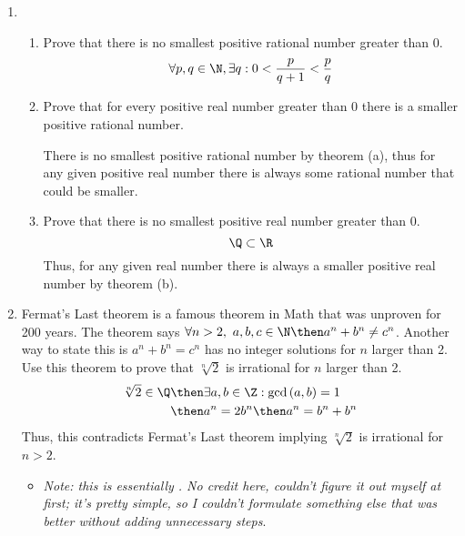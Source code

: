 \documentclass[basic, header]{nosvagor-notes}
\begin{document}
\begin{enumerate}[itemsep=5em]
    \item
    \begin{enumerate}[itemsep=3em]

      \item Prove that there is no smallest positive rational number greater
        than 0.
        \begin{align*}
          \forall p,q \in \N, \exists q : 0 < \frac{p}{q+1} < \frac{p}{q}
        \end{align*}

      \item Prove that for every positive real number greater than 0 there is a
        smaller positive rational number.

        There is no smallest positive rational number by theorem (a), thus
        for any given positive real number there is always some rational number
        that could be smaller.


      \item Prove that there is no smallest positive real number greater than 0.
        \[\Q \subset \R\]
        Thus, for any given real number there is always a smaller positive real
        number by theorem (b).

    \end{enumerate}

  \newpage %

  \item Fermat’s Last theorem is a famous theorem in Math that was unproven for
    200 years. The theorem says \(\forall n > 2,~ a,b,c \in \N \then  a^n +
    b^n \neq c^n\). Another way to state this is \(a^n + b^n = c^n\) has no integer
    solutions for $n$ larger than 2. Use this theorem to prove that \(\sqrt[n]{2}\) is
    irrational for $n$ larger than 2.
    \begin{align*}
      \sqrt[n]{2} \in \Q &\then \exists a,b \in \Z : \gcd{(a,b)}=1 \\
                         &\then a^n = 2b^n \then a^n = b^n + b^n
    \end{align*}
    Thus, this contradicts Fermat's Last theorem implying \(\sqrt[n]{2}\) is
    irrational for \(n > 2\).

    \begin{itemize}
      \item \textit{ Note: this is essentially
        . No
        credit here, couldn't figure it out myself at first; it's pretty
        simple, so I couldn't formulate something else that was better
        without adding unnecessary steps}.

    \end{itemize}

\end{enumerate}
\end{document}
